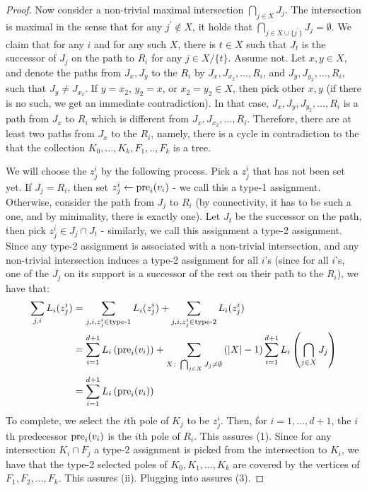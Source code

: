 \begin{proof}
    
    Now consider a non-trivial maximal intersection $\bigcap_{j \in X} J_{j}$. The intersection is maximal in the sense that for any $j^{\prime} \notin X$, it holds that $\bigcap_{j \in X\cup \{j^{\prime} \}} J_{j} = \emptyset$. We claim that for any $i$ and for any such $X$, there is $t \in X$ such that $J_{t}$ is the successor of $J_{j}$ on the path to $R_{i}$ for any $j \in X/\{t\}$. Assume not. Let $x, y \in X$, and denote the paths from $J_{x}, J_{y}$ to the $R_{i}$ by $J_{x}, J_{x_2}, \ldots, R_{i}$, and $J_{y}, J_{y_2}, \ldots, R_{i}$, such that $J_{y} \neq J_{x_{2}}$. If $y = x_{2}$, $y_{2} = x$, or $x_{2} = y_{2} \in X$, then pick other $x, y$ (if there is no such, we get an immediate contradiction). In that case, $J_{x}, J_{y}, J_{y_{2}}, \ldots, R_{i}$ is a path from $J_{x}$ to $R_{i}$ which is different from $J_{x}, J_{x_{2}}, \ldots, R_{i}$. Therefore, there are at least two paths from $J_{x}$ to the $R_{i}$, namely, there is a cycle in contradiction to the that the collection $K_{0}, \ldots, K_{k}, F_{1},..,F_{k}$ is a tree.


    We will choose the $z_{j}^{i}$ by the following process. Pick a $z_{j}^{i}$ that has not been set yet. If $J_{j} = R_{i}$, then set $z_{j}^{i} \leftarrow \text{pre}_{i}(v_{i})$ - we call this a type-1 assignment. Otherwise, consider the path from $J_{j}$ to $R_{i}$ (by connectivity, it has to be such a one, and by minimality, there is exactly one). Let $J_{t}$ be the successor on the path, then pick $z_{j}^{i} \in J_{j} \cap J_{t}$ - similarly, we call this assignment a type-2 assignment. Since any type-2 assignment is associated with a non-trivial intersection, and any non-trivial intersection induces a type-2 assignment for all $i$'s (since for all $i$'s, one of the $J_{j}$ on its support is a successor of the rest on their path to the $R_{i}$), we have that:
    \begin{equation}
      \label{equ:span}
      \begin{split}
        \sum_{j,i}L_{i}(z_{j}^{i}) &= \sum_{j,i, z_{j}^{i} \in \text{type-1}}L_{i}(z_{j}^{i}) + \sum_{j,i, z_{j}^{i} \in \text{type-2}}L_{i}(z_{j}^{i}) \\
        &= \sum_{i=1}^{d+1}L_{i}\left( \text{pre}_{i}(v_{i}) \right) + \sum_{X \colon \bigcap_{j\in X}J_{j} \neq \emptyset }\left(|X|-1\right) \sum_{i=1}^{d+1} L_{i}\left(\bigcap_{j\in X}J_{j} \right) \\ 
        &=\sum_{i=1}^{d+1}L_{i}\left( \text{pre}_{i}(v_{i}) \right) 
      \end{split}
    \end{equation}
To complete, we select the $i$th pole of $K_{j}$ to be $z^{i}_{j}$. Then, for $i=1,\ldots,d+1$, the $i$th predecessor $\text{pre}_{i}(v_{i})$ is the $i$th pole of $R_{i}$. This assures (1). Since for any intersection $K_{i}\cap F_{j}$ a type-2 assignment is picked from the intersection to $K_{i}$, we have that the type-2 selected poles of $K_{0},K_{1},\ldots,K_{k}$ are covered by the vertices of $F_{1},F_{2},\ldots,F_{k}$. This assures (ii). Plugging  into  assures (3).
  \end{proof}



